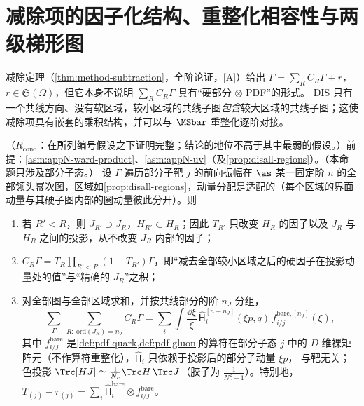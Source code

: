 \section{减除项的因子化结构、重整化相容性与两级梯形图}\label{sec:disall-subtraction}

减除定理（\cref{thm:method-subtraction}，全阶论证，[A]）给出 $\Gamma=\sum_RC_R\Gamma+r$，$r\in\mathfrak S(\Omega)$，但它本身不说明 $\sum_RC_R\Gamma$ 具有“硬部分 $\otimes$ PDF”的形式。
DIS 只有一个共线方向、没有软区域，较小区域的共线子图\emph{包含}较大区域的共线子图；这使减除项具有嵌套的乘积结构，并可以与 $\MSbar$ 重整化逐阶对接。

\begin{proposition}\label{prop:disall-factorized-subtraction}
（$R_{\mathrm{cond}}$：在所列编号假设之下证明完整；结论的地位不高于其中最弱的假设。）前提：\cref{asm:appN-ward-product}、\cref{asm:appN-uv}（及\cref{prop:disall-regions}）。（本命题只涉及部分子态。）
设 $\Gamma$ 遍历部分子靶 $j$ 的前向振幅在 $\as$ 某一固定阶 $n$ 的全部领头幂次图，区域如\cref{prop:disall-regions}，动量分配是适配的（每个区域的界面动量与其硬子图内部的圈动量彼此分开）。则
\begin{enumerate}[label=(\roman*),leftmargin=2em,itemsep=1pt,topsep=2pt]
\item 若 $R'<R$，则 $J_{R'}\supset J_R$，$H_{R'}\subset H_R$；因此 $T_{R'}$ 只改变 $H_R$ 的因子以及 $J_R$ 与 $H_R$ 之间的投影，从不改变 $J_R$ 内部的因子；
\item $C_R\Gamma=T_R\prod_{R'<R}(1-T_{R'})\Gamma$，即“减去全部较小区域之后的硬因子在投影动量处的值”与“精确的 $J_R$”之积；
\item 对全部图与全部区域求和，并按共线部分的阶 $n_J$ 分组，
\begin{equation}\label{eq:disall-factorized}
\sum_\Gamma\ \sum_{R:\ \mathrm{ord}(J_R)=n_J}C_R\Gamma=\sum_i\int\frac{\dd\xi}{\xi}\,\hat{\mathsf H}^{[n-n_J]}_i(\xi p,q)\,f^{\mathrm{bare},[n_J]}_{i/j}(\xi),
\end{equation}
其中 $f^{\mathrm{bare}}_{i/j}$ 是\cref{def:pdf-quark,def:pdf-gluon}的算符在部分子态 $j$ 中的 $D$ 维裸矩阵元（不作算符重整化），$\hat{\mathsf H}_i$ 只依赖于投影后的部分子动量 $\xi p$，
与靶无关；色投影 $\Trc[HJ]\simeq\frac1{N_c}\Trc H\,\Trc J$（胶子为 $\frac1{N_c^2-1}$）。特别地，$T_{(j)}-r_{(j)}=\sum_i\hat{\mathsf H}^{\mathrm{bare}}_i\otimes f^{\mathrm{bare}}_{i/j}$。
\end{enumerate}
\end{proposition}

